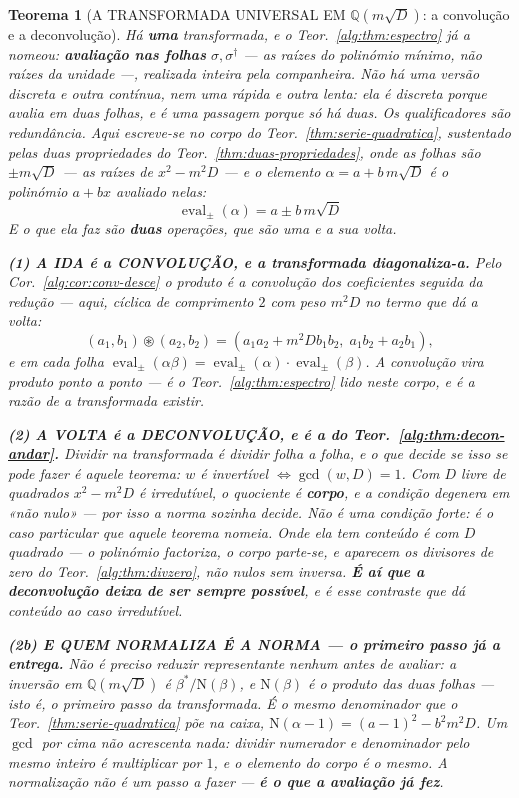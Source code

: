 \documentclass[11pt,a4paper]{article}
\newtheorem{teorema}{Teorema}
\newcommand{\dg}{^{\dagger}}
\begin{document}
\begin{teorema}[A TRANSFORMADA UNIVERSAL EM $\mathbb{Q}(m\sqrt D)$: a convolução e a
deconvolução]\label{thm:transformada-universal}
Há \textbf{uma} transformada, e o Teor.~\ref{alg:thm:espectro} já a nomeou: \textbf{avaliação
nas folhas} $\sigma,\sigma\dg$ --- as raízes do polinómio mínimo, \emph{não} raízes da
unidade ---, realizada inteira pela companheira. Não há uma versão discreta e outra
contínua, nem uma rápida e outra lenta: \emph{ela é discreta porque avalia em duas folhas,
e é uma passagem porque só há duas}. Os qualificadores são redundância. Aqui escreve-se no
corpo do Teor.~\ref{thm:serie-quadratica}, sustentado pelas duas propriedades do
Teor.~\ref{thm:duas-propriedades}, onde as folhas são $\pm m\sqrt D$ --- as raízes
de $x^{2}-m^{2}D$ --- e o elemento $\alpha=a+b\,m\sqrt D$ é o polinómio $a+bx$ avaliado
nelas:
\[
\boxed{\;\operatorname{eval}_{\pm}(\alpha)=a\pm b\,m\sqrt D\;}
\]
E o que ela faz são \textbf{duas} operações, que são uma e a sua volta.

\textbf{(1) A IDA é a CONVOLUÇÃO, e a transformada diagonaliza-a.} Pelo
Cor.~\ref{alg:cor:conv-desce} o produto é a convolução dos coeficientes seguida da redução ---
aqui, cíclica de comprimento $2$ com peso $m^{2}D$ no termo que dá a volta:
\[
(a_1,b_1)\circledast(a_2,b_2)=(a_1a_2+m^{2}Db_1b_2,\;a_1b_2+a_2b_1),
\]
e em cada folha
$\operatorname{eval}_\pm(\alpha\beta)=\operatorname{eval}_\pm(\alpha)\cdot
\operatorname{eval}_\pm(\beta)$. \emph{A convolução vira produto ponto a ponto} --- é o
Teor.~\ref{alg:thm:espectro} lido neste corpo, e é a razão de a transformada existir.

\textbf{(2) A VOLTA é a DECONVOLUÇÃO, e é a do Teor.~\ref{alg:thm:decon-andar}.} Dividir na
transformada é dividir folha a folha, e o que decide se isso se pode fazer é aquele
teorema: $w$ é invertível $\iff\gcd(w,D)=1$. Com $D$ livre de quadrados $x^{2}-m^{2}D$ é
irredutível, o quociente é \textbf{corpo}, e a condição \emph{degenera} em «não nulo» ---
por isso a norma sozinha decide. \emph{Não é uma condição forte: é o caso particular que
aquele teorema nomeia.} Onde ela tem conteúdo é com $D$ quadrado --- o polinómio factoriza,
o corpo parte-se, e aparecem os divisores de zero do Teor.~\ref{alg:thm:divzero}, não nulos sem
inversa. \textbf{É aí que a deconvolução deixa de ser sempre possível}, e é esse contraste
que dá conteúdo ao caso irredutível.

\textbf{(2b) E QUEM NORMALIZA É A NORMA --- o primeiro passo já a entrega.} Não é preciso
reduzir representante nenhum antes de avaliar: a inversão em $\mathbb{Q}(m\sqrt D)$ é
$\beta^{\ast}/\mathrm{N}(\beta)$, e $\mathrm{N}(\beta)$ \emph{é o produto das duas folhas}
--- isto é, o primeiro passo da transformada. É o mesmo denominador que o
Teor.~\ref{thm:serie-quadratica} põe na caixa, $\mathrm{N}(\alpha-1)=(a-1)^{2}-b^{2}m^{2}D$.
\emph{Um $\gcd$ por cima não acrescenta nada}: dividir numerador e denominador pelo mesmo
inteiro é multiplicar por $1$, e o elemento do corpo é o mesmo. A normalização não é um
passo a fazer --- \textbf{é o que a avaliação já fez}.


\end{teorema}
\end{document}
